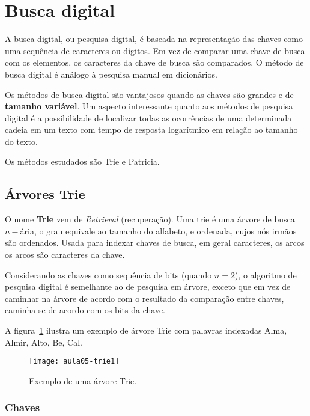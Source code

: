 \section{Busca digital}

A busca digital, ou pesquisa digital, é baseada na representação das chaves como uma 
sequência de caracteres ou dígitos.
Em vez de comparar uma chave de busca com os elementos, os caracteres da chave
de busca são comparados.
O método de busca digital é análogo à pesquisa manual em dicionários.

Os métodos de busca digital são vantajosos quando as chaves são grandes e de 
\textbf{tamanho variável}.
Um aspecto interessante quanto aos métodos de pesquisa digital é a possibilidade
de localizar todas as ocorrências de uma determinada cadeia em um texto com tempo
de resposta logarítmico em relação ao tamanho do texto.

Os métodos estudados são Trie e Patricia.

\subsection{Árvores Trie}

O nome \textbf{Trie} vem de \emph{Retrieval} (recuperação).
Uma trie é uma árvore de busca $n-$ária, o grau equivale ao tamanho do
alfabeto, e ordenada, cujos nós irmãos são ordenados.
Usada para indexar chaves de busca, em geral caracteres, os arcos
os arcos são caracteres da chave.

Considerando as chaves como sequência de bits (quando $n = 2$), o algoritmo
de pesquisa digital é semelhante ao de pesquisa em árvore, exceto que em vez de
caminhar na árvore de acordo com o resultado da comparação entre chaves, caminha-se
de acordo com os bits da chave.

A figura~\ref{aula05:fig:trie1} ilustra um exemplo de árvore Trie com palavras indexadas
Alma, Almir, Alto, Be, Cal.
%
\begin{figure}[ht]
\centering
\texttt{[image: aula05-trie1]}
\caption{Exemplo de uma árvore Trie.}
\label{aula05:fig:trie1}
\end{figure}

\subsubsection{Chaves}

